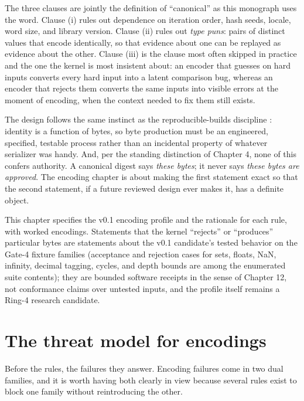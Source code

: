The three clauses are jointly the definition of ``canonical'' as this
monograph uses the word. Clause (i) rules out dependence on iteration order,
hash seeds, locale, word size, and library version. Clause (ii) rules out
\emph{type puns}: pairs of distinct values that encode identically, so that
evidence about one can be replayed as evidence about the other. Clause (iii)
is the clause most often skipped in practice and the one the kernel is most
insistent about: an encoder that guesses on hard inputs converts every hard
input into a latent comparison bug, whereas an encoder that rejects them
converts the same inputs into visible errors at the moment of encoding, when
the context needed to fix them still exists.

The design follows the same instinct as the reproducible-builds
discipline \cite{reprobuilds}: identity is a function
of bytes, so byte production must be an engineered, specified, testable
process rather than an incidental property of whatever serializer was handy.
And, per the standing distinction of Chapter 4, none of this confers
authority. A canonical digest says \emph{these bytes}; it never says
\emph{these bytes are approved}. The encoding chapter is about making the
first statement exact so that the second statement, if a future reviewed
design ever makes it, has a definite object.

\begin{boundary}\label{ch05:bd:scope}
This chapter specifies the v0.1 encoding profile and the rationale for each
rule, with worked encodings. Statements that the kernel ``rejects'' or
``produces'' particular bytes are statements about the v0.1 candidate's
tested behavior on the Gate-4 fixture families (acceptance and rejection
cases for sets, floats, NaN, infinity, decimal tagging, cycles, and depth
bounds are among the enumerated suite contents); they are bounded software
receipts in the sense of Chapter 12, not conformance claims over untested
inputs, and the profile itself remains a Ring-4 research candidate.
\end{boundary}

\section{The threat model for encodings}\label{ch05:threats}

Before the rules, the failures they answer. Encoding failures come in two
dual families, and it is worth having both clearly in view because several
rules exist to block one family without reintroducing the other.


